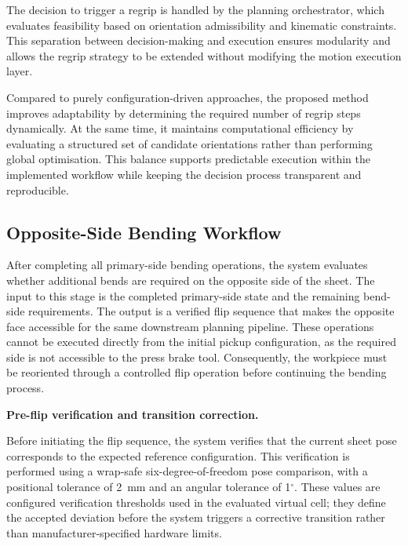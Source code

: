 The decision to trigger a regrip is handled by the planning orchestrator, which evaluates feasibility based on orientation admissibility and kinematic constraints. This separation between decision-making and execution ensures modularity and allows the regrip strategy to be extended without modifying the motion execution layer.

Compared to purely configuration-driven approaches, the proposed method improves adaptability by determining the required number of regrip steps dynamically. At the same time, it maintains computational efficiency by evaluating a structured set of candidate orientations rather than performing global optimisation. This balance supports predictable execution within the implemented workflow while keeping the decision process transparent and reproducible.



\subsection{Opposite-Side Bending Workflow}
\label{sec:opposite-side}

After completing all primary-side bending operations, the system evaluates whether additional bends are required on the opposite side of the sheet. The input to this stage is the completed primary-side state and the remaining bend-side requirements. The output is a verified flip sequence that makes the opposite face accessible for the same downstream planning pipeline. These operations cannot be executed directly from the initial pickup configuration, as the required side is not accessible to the press brake tool. Consequently, the workpiece must be reoriented through a controlled flip operation before continuing the bending process.

\label{sec:pre-flip-verification-transition-correction}
\noindent\textbf{Pre-flip verification and transition correction.}

Before initiating the flip sequence, the system verifies that the current sheet pose corresponds to the expected reference configuration. This verification is performed using a wrap-safe six-degree-of-freedom pose comparison, with a positional tolerance of 2~mm and an angular tolerance of 1$^\circ$. These values are configured verification thresholds used in the evaluated virtual cell; they define the accepted deviation before the system triggers a corrective transition rather than manufacturer-specified hardware limits.

